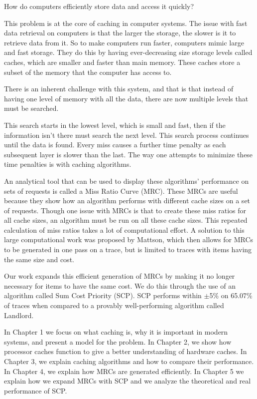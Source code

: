 


How do computers efficiently store data and access it quickly? 


This problem is at the core of caching in computer systems. The issue with fast data retrieval on computers is that the larger the storage, the slower is it to retrieve data from it. So to make computers run faster, computers mimic large and fast storage. They do this by having ever-decreasing size storage levels called caches, which are smaller and faster than main memory. These caches store a subset of the memory that the computer has access to.

There is an inherent challenge with this system, and that is that instead of having one level of memory with all the data, there are now multiple levels that must be searched.


This search starts in the lowest level, which is small and fast, then if the information isn't there must search the next level. This search process continues until the data is found. Every miss causes a further time penalty as each subsequent layer is slower than the last. The way one attempts to minimize these time penalties is with caching algorithms.

An analytical tool that can be used to display these algorithms' performance on sets of requests is called a Miss Ratio Curve (MRC). 
These MRCs are useful because they show how an algorithm performs with different cache sizes on a set of requests. Though one issue with MRCs is that to create these miss ratios for all cache sizes, an algorithm must be run on all these cache sizes. This repeated calculation of miss ratios takes a lot of computational effort. A solution to this large computational work was proposed by Mattson, which then allows for MRCs to be generated in one pass on a trace, but is limited to traces with items having the same size and cost. 



Our work expands this efficient generation of MRCs by making it no longer necessary for items to have the same cost. We do this through the use of an algorithm called Sum Cost Priority (SCP). SCP performs within $\pm$5\% on 65.07\% of traces when compared to a provably well-performing algorithm called Landlord.

In Chapter 1 we focus on what caching is, why it is important in modern systems, and present a model for the problem. In Chapter 2, we show how processor caches function to give a better understanding of hardware caches. In Chapter 3, we explain caching algorithms and how to compare their performance. In Chapter 4, we explain how MRCs are generated efficiently. In Chapter 5 we explain how we expand MRCs with SCP and we analyze the theoretical and real performance of SCP.